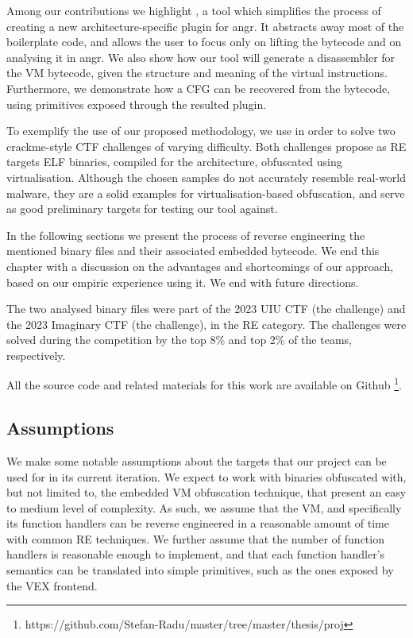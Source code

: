 Among our contributions we highlight , a tool which simplifies the process of creating a new architecture-specific plugin for angr. It abstracts away most of the boilerplate code, and allows the user to focus only on lifting the bytecode and on analysing it in angr. We also show how our tool will generate a disassembler for the \gls{VM} bytecode, given the structure and meaning of the virtual instructions. Furthermore, we demonstrate how a \gls{CFG} can be recovered from the bytecode, using primitives exposed through the resulted plugin.

To exemplify the use of our proposed methodology, we use  in order to solve two crackme-style \gls{CTF} challenges of varying difficulty. Both challenges propose as \gls{RE} targets \gls{ELF} binaries, compiled for the  architecture, obfuscated using virtualisation. Although the chosen samples do not accurately resemble real-world malware, they are a solid examples for virtualisation-based obfuscation, and serve as good preliminary targets for testing our tool against.

In the following sections we present the process of reverse engineering the mentioned binary files and their associated embedded bytecode. We end this chapter with a discussion on the advantages and shortcomings of our approach, based on our empiric experience using it. We end with future directions.

The two analysed binary files were part of the 2023 UIU CTF (the  challenge) \cite{uiu2023} and the 2023 Imaginary CTF \cite{ictf2023} (the  challenge), in the \gls{RE} category. The challenges were solved during the competition by the top 8\% and top 2\% of the teams, respectively.

All the source code and related materials for this work are available on Github \footnote{https://github.com/Stefan-Radu/master/tree/master/thesis/proj}.

\subsection{Assumptions}

We make some notable assumptions about the targets that our project can be used for in its current iteration. We expect to work with binaries obfuscated with, but not limited to, the embedded \gls{VM} obfuscation technique, that present an easy to medium level of complexity. As such, we assume that the \gls{VM}, and specifically its function handlers can be reverse engineered in a reasonable amount of time with common \gls{RE} techniques. We further assume that the number of function handlers is reasonable enough to implement, and that each function handler's semantics can be translated into simple primitives, such as the ones exposed by the  VEX frontend.

